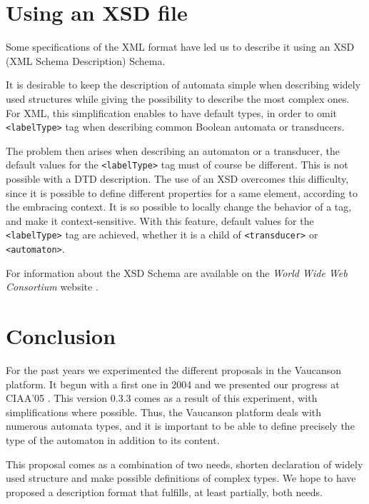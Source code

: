 \documentclass[a4paper]{article}
\newcommand{\Vauc}{{\sc Vaucanson}\xspace}
\newcommand{\xtag}[1]{\texttt{<#1>}}
\begin{document}
\section{Using an XSD file}

Some specifications of the XML format have led us to describe it using an XSD
(XML Schema Description) Schema.

It is desirable to keep the description of automata simple when
describing widely used structures while giving the possibility to
describe the most complex ones. For XML, this simplification enables
to have default types, in order to omit \xtag{labelType} tag when describing
common Boolean automata or transducers.

The problem then arises when describing an automaton or a transducer,
the default values for the \xtag{labelType} tag must of course be different.
This is not possible with a DTD description.  The use of an XSD
overcomes this difficulty, since it is possible to define different
properties for a same element, according to the embracing context. It
is so possible to locally change the behavior of a tag, and make it
context-sensitive. With this feature, default values for the
\xtag{labelType} tag are achieved, whether it is a child of
\xtag{transducer} or \xtag{automaton}.

For information about the XSD Schema are available on the
\textit{World Wide Web Consortium} website \cite{w3c.www}.

\section{Conclusion}

For the past years we experimented the different proposals in the
\Vauc platform. It begun with a first one in 2004 \cite{vaucanson.04.techrep}
and we presented our progress at CIAA'05 \cite{claveirole.05.ciaa}.
This version 0.3.3 comes as a result of this experiment, with
simplifications where possible. Thus, the \Vauc platform deals
with numerous automata types, and it is important to be able to define
precisely the type of the automaton in addition to its content.

This proposal comes as a combination of two needs, shorten declaration
of widely used structure and make possible definitions of complex
types. We hope to have proposed a description format that fulfills, at
least partially, both needs.

\nocite{lombardy.04.tcs}
\cite{claveirole.05.ciaa}
\cite{vaucanson.04.techrep}
\nocite{vaucanson.www.xml}
\cite{vaucanson.www.xsd}
\cite{w3c.www}




\end{document}
